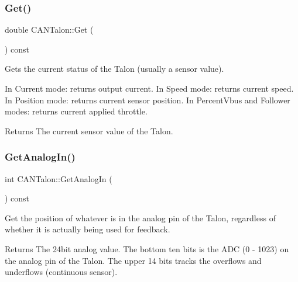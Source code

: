 \subsubsection{\texorpdfstring{Get()}{Get()}}
{\footnotesize\ttfamily double C\+A\+N\+Talon\+::\+Get (\begin{DoxyParamCaption}{ }\end{DoxyParamCaption}) const\hspace{0.3cm}{\ttfamily [override]}}

Gets the current status of the Talon (usually a sensor value).

In Current mode\+: returns output current. In Speed mode\+: returns current speed. In Position mode\+: returns current sensor position. In Percent\+Vbus and Follower modes\+: returns current applied throttle.

\begin{DoxyReturn}{Returns}
The current sensor value of the Talon. 
\end{DoxyReturn}
\mbox{\label{class_c_a_n_talon_a8dbf7974dc2877b4b32c1462e16fb9f1}} 
\subsubsection{\texorpdfstring{Get\+Analog\+In()}{GetAnalogIn()}}
{\footnotesize\ttfamily int C\+A\+N\+Talon\+::\+Get\+Analog\+In (\begin{DoxyParamCaption}{ }\end{DoxyParamCaption}) const\hspace{0.3cm}{\ttfamily [virtual]}}

Get the position of whatever is in the analog pin of the Talon, regardless of whether it is actually being used for feedback.

\begin{DoxyReturn}{Returns}
The 24bit analog value. The bottom ten bits is the A\+DC (0 -\/ 1023) on the analog pin of the Talon. The upper 14 bits tracks the overflows and underflows (continuous sensor). 
\end{DoxyReturn}
\mbox{\label{class_c_a_n_talon_aaf2d5a3f142d57b8a5f17be332d57b58}} 
